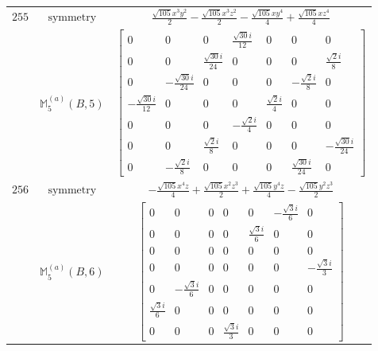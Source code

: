 \documentclass[fleqn,8pt,landscape]{jsarticle}
\begin{document}
\begin{longtable}{ccc}
$ 255 $ & $ \text{symmetry} $ & $ \frac{\sqrt{105} x^{3} y^{2}}{2} - \frac{\sqrt{105} x^{3} z^{2}}{2} - \frac{\sqrt{105} x y^{4}}{4} + \frac{\sqrt{105} x z^{4}}{4} $ \\
$  $ & $ \mathbb{M}_{5}^{(a)}(B,5) $ & $ \begin{bmatrix} 0 & 0 & 0 & \frac{\sqrt{30} i}{12} & 0 & 0 & 0 \\ 0 & 0 & \frac{\sqrt{30} i}{24} & 0 & 0 & 0 & \frac{\sqrt{2} i}{8} \\ 0 & - \frac{\sqrt{30} i}{24} & 0 & 0 & 0 & - \frac{\sqrt{2} i}{8} & 0 \\ - \frac{\sqrt{30} i}{12} & 0 & 0 & 0 & \frac{\sqrt{2} i}{4} & 0 & 0 \\ 0 & 0 & 0 & - \frac{\sqrt{2} i}{4} & 0 & 0 & 0 \\ 0 & 0 & \frac{\sqrt{2} i}{8} & 0 & 0 & 0 & - \frac{\sqrt{30} i}{24} \\ 0 & - \frac{\sqrt{2} i}{8} & 0 & 0 & 0 & \frac{\sqrt{30} i}{24} & 0 \end{bmatrix} $ \\ \hline
$ 256 $ & $ \text{symmetry} $ & $ - \frac{\sqrt{105} x^{4} z}{4} + \frac{\sqrt{105} x^{2} z^{3}}{2} + \frac{\sqrt{105} y^{4} z}{4} - \frac{\sqrt{105} y^{2} z^{3}}{2} $ \\
$  $ & $ \mathbb{M}_{5}^{(a)}(B,6) $ & $ \begin{bmatrix} 0 & 0 & 0 & 0 & 0 & - \frac{\sqrt{3} i}{6} & 0 \\ 0 & 0 & 0 & 0 & \frac{\sqrt{3} i}{6} & 0 & 0 \\ 0 & 0 & 0 & 0 & 0 & 0 & 0 \\ 0 & 0 & 0 & 0 & 0 & 0 & - \frac{\sqrt{3} i}{3} \\ 0 & - \frac{\sqrt{3} i}{6} & 0 & 0 & 0 & 0 & 0 \\ \frac{\sqrt{3} i}{6} & 0 & 0 & 0 & 0 & 0 & 0 \\ 0 & 0 & 0 & \frac{\sqrt{3} i}{3} & 0 & 0 & 0 \end{bmatrix} $ \\ \hline
\end{longtable}
\end{document}
